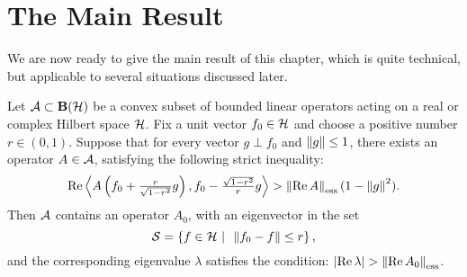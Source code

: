 \section{The Main Result}

We are now ready to give the main result of this chapter, which is quite
technical, but applicable to several situations discussed later.

\smallskip

\begin{prop} \label{p:ESS}
Let ${\cal A}\subset\mathbf B(\cal H)$ be a convex subset of bounded linear operators acting on a
real or complex Hilbert space ${\cal H}$. Fix a unit vector $f_0\in{\cal H}$ and choose a
positive number $r\in(0,1)$. Suppose that for every vector $g\perp{}f_0$ and
$\left\Vert g\right\Vert\leq1$, there exists an operator $A\in{\cal A}$, satisfying the following
strict inequality:
\begin{equation}\label{e:ESSCON}
  \RE\seq{A\left(f_0+\tfrac{r}{\sqrt{1-r^2}}g\right),
                 f_0-\tfrac{\sqrt{1-r^2}}{r}g} >
  \essnorm{\RE{}A}(1 - \norm{g}^2).
\end{equation}
Then ${\cal A}$ contains an operator $A_0$, with an eigenvector in the set
\[ {\cal S}=\left\{f\in{\cal H}\,\,|\,\,\,\left\Vert f_0-f\right\Vert\leq{}r\right\}, \]
and the corresponding eigenvalue $\lambda$ satisfies the condition:
$\abs{\RE\lambda}>\essnorm{\RE{}A_0}$.
\end{prop}


